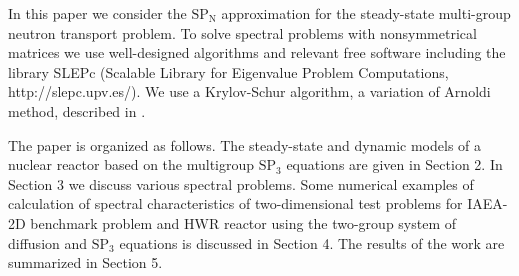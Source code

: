 \documentclass[authoryear]{elsarticle}
\begin{document}
In this paper we consider the $\mathrm{SP_N}$ approximation for the steady-state multi-group neutron transport problem.
To solve spectral problems with nonsymmetrical matrices we use well-designed algorithms and relevant free software including the library SLEPc (Scalable Library for Eigenvalue Problem Computations, http://slepc.upv.es/). 
We use a Krylov-Schur algorithm, a variation of Arnoldi method, described in \citep{stewart2002krylov}.

The paper is organized as follows. 
The steady-state and dynamic models of a nuclear reactor based on the multigroup $\mathrm{SP_3}$ equations are given in Section 2. 
In Section 3 we discuss various spectral problems. 
Some numerical examples of calculation of spectral characteristics of two-dimensional test problems for IAEA-2D benchmark problem and HWR reactor using the two-group system of diffusion and $\mathrm{SP_3}$ equations is discussed in Section 4. 
The results of the work are summarized in Section 5.
\end{document}
